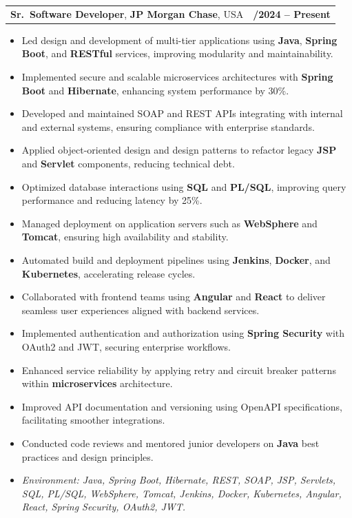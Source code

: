 \documentclass[letterpaper,11pt]{article}
\makeatletter
\newcommand{\resumeItem}[1]{
  \item\footnotesize{
    {#1 \vspace{-2pt}}
  }
}
\newcommand{\resumeSubheading}[4]{
  \vspace{-2pt}\item
    \begin{tabular*}{1.0\textwidth}[t]{l@{\extracolsep{\fill}}r}
      \textbf{\fontsize{10pt}{14pt}\selectfont #3}, \textbf{\fontsize{10pt}{14pt}\selectfont #1}, \fontsize{10pt}{14pt}\selectfont #4 & \textbf{\fontsize{10pt}{14pt}\selectfont #2} \\
    \end{tabular*}\vspace{-7pt}
}
\newcommand{\resumeItemListStart}{\begin{itemize}[leftmargin=*]}
\newcommand{\resumeItemListEnd}{\end{itemize}\vspace{-5pt}}
\makeatother
\begin{document}
\resumeSubheading
{JP Morgan Chase}{09/2024 -- Present}
{Sr.\ Software Developer}{USA}
\resumeItemListStart
  \resumeItem{Led design and development of multi-tier applications using \textbf{Java}, \textbf{Spring Boot}, and \textbf{RESTful} services, improving modularity and maintainability.}
  \resumeItem{Implemented secure and scalable microservices architectures with \textbf{Spring Boot} and \textbf{Hibernate}, enhancing system performance by 30\%.}
  \resumeItem{Developed and maintained SOAP and REST APIs integrating with internal and external systems, ensuring compliance with enterprise standards.}
  \resumeItem{Applied object-oriented design and design patterns to refactor legacy \textbf{JSP} and \textbf{Servlet} components, reducing technical debt.}
  \resumeItem{Optimized database interactions using \textbf{SQL} and \textbf{PL/SQL}, improving query performance and reducing latency by 25\%.}
  \resumeItem{Managed deployment on application servers such as \textbf{WebSphere} and \textbf{Tomcat}, ensuring high availability and stability.}
  \resumeItem{Automated build and deployment pipelines using \textbf{Jenkins}, \textbf{Docker}, and \textbf{Kubernetes}, accelerating release cycles.}
  \resumeItem{Collaborated with frontend teams using \textbf{Angular} and \textbf{React} to deliver seamless user experiences aligned with backend services.}
  \resumeItem{Implemented authentication and authorization using \textbf{Spring Security} with OAuth2 and JWT, securing enterprise workflows.}
  \resumeItem{Enhanced service reliability by applying retry and circuit breaker patterns within \textbf{microservices} architecture.}
  \resumeItem{Improved API documentation and versioning using OpenAPI specifications, facilitating smoother integrations.}
  \resumeItem{Conducted code reviews and mentored junior developers on \textbf{Java} best practices and design principles.}
  \resumeItem{\textit{Environment: Java, Spring Boot, Hibernate, REST, SOAP, JSP, Servlets, SQL, PL/SQL, WebSphere, Tomcat, Jenkins, Docker, Kubernetes, Angular, React, Spring Security, OAuth2, JWT.}}
\resumeItemListEnd
\end{document}
